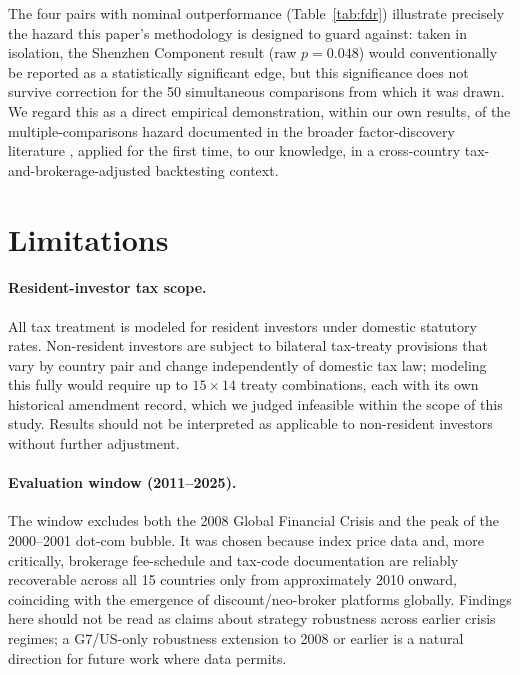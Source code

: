 \documentclass[11pt]{article}
\begin{document}
The four pairs with nominal outperformance (Table~\ref{tab:fdr}) illustrate precisely the hazard this paper's methodology is designed to guard against: taken in isolation, the Shenzhen Component result (raw $p=0.048$) would conventionally be reported as a statistically significant edge, but this significance does not survive correction for the 50 simultaneous comparisons from which it was drawn. We regard this as a direct empirical demonstration, within our own results, of the multiple-comparisons hazard documented in the broader factor-discovery literature \citep{harvey2016}, applied for the first time, to our knowledge, in a cross-country tax-and-brokerage-adjusted backtesting context.

\section{Limitations}
\label{sec:limitations}

\paragraph{Resident-investor tax scope.} All tax treatment is modeled for resident investors under domestic statutory rates. Non-resident investors are subject to bilateral tax-treaty provisions that vary by country pair and change independently of domestic tax law; modeling this fully would require up to $15 \times 14$ treaty combinations, each with its own historical amendment record, which we judged infeasible within the scope of this study. Results should not be interpreted as applicable to non-resident investors without further adjustment.

\paragraph{Evaluation window (2011--2025).} The window excludes both the 2008 Global Financial Crisis and the peak of the 2000--2001 dot-com bubble. It was chosen because index price data and, more critically, brokerage fee-schedule and tax-code documentation are reliably recoverable across all 15 countries only from approximately 2010 onward, coinciding with the emergence of discount/neo-broker platforms globally. Findings here should not be read as claims about strategy robustness across earlier crisis regimes; a G7/US-only robustness extension to 2008 or earlier is a natural direction for future work where data permits.
\end{document}
